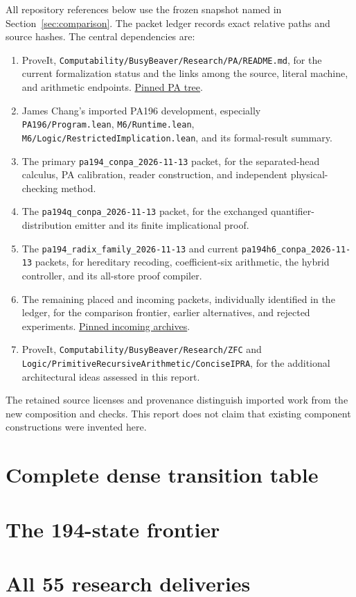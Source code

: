 \documentclass[11pt,letterpaper]{article}
\newcommand{\file}[1]{\texttt{\nolinkurl{#1}}}
\begin{document}
All repository references below use the frozen snapshot named in
Section~\ref{sec:comparison}. The packet ledger records exact relative
paths and source hashes. The central dependencies are:
\begin{enumerate}
\item ProveIt, \file{Computability/BusyBeaver/Research/PA/README.md}, for
 the current formalization status and the links among the source, literal
 machine, and arithmetic endpoints.
 \href{https://github.com/VladimirReshetnikov/ProveIt/tree/2e00058366845a6e2e0368004fd9ed2050a06a9a/Computability/BusyBeaver/Research/PA}{Pinned PA tree}.
\item James Chang's imported PA196 development, especially
 \file{PA196/Program.lean}, \file{M6/Runtime.lean},
 \file{M6/Logic/RestrictedImplication.lean}, and its formal-result summary.
\item The primary \file{pa194_conpa_2026-11-13} packet, for the
 separated-head calculus, PA calibration, reader construction, and
 independent physical-checking method.
\item The \file{pa194q_conpa_2026-11-13} packet, for the exchanged
 quantifier-distribution emitter and its finite implicational proof.
\item The \file{pa194_radix_family_2026-11-13} and current
 \file{pa194h6_conpa_2026-11-13} packets, for hereditary recoding,
 coefficient-six arithmetic, the hybrid controller, and its all-store
 proof compiler.
\item The remaining placed and incoming packets, individually identified
 in the ledger, for the comparison frontier, earlier alternatives, and
 rejected experiments.
 \href{https://github.com/VladimirReshetnikov/ProveIt/tree/2e00058366845a6e2e0368004fd9ed2050a06a9a/docs/incoming}{Pinned incoming archives}.
\item ProveIt, \file{Computability/BusyBeaver/Research/ZFC} and
 \file{Logic/PrimitiveRecursiveArithmetic/ConciseIPRA}, for the additional
 architectural ideas assessed in this report.
\end{enumerate}
The retained source licenses and provenance distinguish imported work from
the new composition and checks. This report does not claim that existing
component constructions were invented here.

\appendix
\clearpage\section{Complete dense transition table}\label{app:table}

\clearpage\section{The 194-state frontier}\label{app:frontier}

\clearpage\section{All 55 research deliveries}\label{app:ledger}

\end{document}

